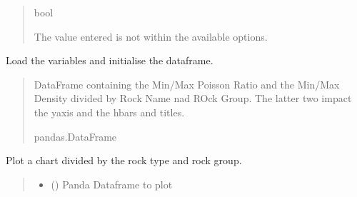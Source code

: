 \documentclass[letterpaper,10pt,english]{sphinxmanual}
\begin{document}
\begin{fulllineitems}
\begin{fulllineitems}
\begin{quote}
\begin{description}
\sphinxAtStartPar
bool

\sphinxAtStartPar
{} \textendash{} The value entered is not within the available options.

\end{description}\end{quote}

\end{fulllineitems}


\begin{fulllineitems}
\label{\detokenize{pyrockmodulus:pyrockmodulus.pyrockmodulus.poisson_density.initial_processing}}
\pysigstartsignatures
{}
\pysigstopsignatures
\sphinxAtStartPar
Load the variables and initialise the dataframe.
\begin{quote}\begin{description}
\sphinxAtStartPar
DataFrame containing the Min/Max Poisson Ratio and the Min/Max Density divided by Rock Name nad ROck Group. The latter two impact the y\sphinxhyphen{}axis and the hbars and titles.

\sphinxAtStartPar
pandas.DataFrame

\end{description}\end{quote}

\end{fulllineitems}


\begin{fulllineitems}
\label{\detokenize{pyrockmodulus:pyrockmodulus.pyrockmodulus.poisson_density.plot_span_chart}}
\pysigstartsignatures
{}
\pysigstopsignatures
\sphinxAtStartPar
Plot a chart divided by the rock type and rock group.
\begin{quote}\begin{description}
\begin{itemize}
\item {} 
\sphinxAtStartPar
{} () \textendash{} Panda Dataframe to plot


\end{itemize}
\end{description}
\end{quote}
\end{fulllineitems}
\end{fulllineitems}
\end{document}
